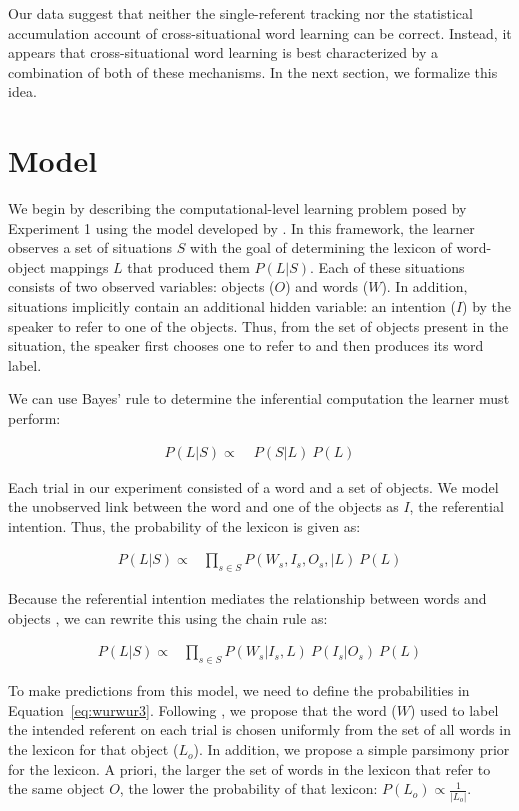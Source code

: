 \documentclass{pnastwo}
\begin{document}
\begin{article}
Our data suggest that neither the single-referent tracking nor the statistical accumulation account of cross-situational word learning can be correct. Instead, it appears that cross-situational word learning is best characterized by a combination of both of these mechanisms. In the next section, we formalize this idea.

\section{Model}

We begin by describing the computational-level learning problem posed by Experiment 1 using the model developed by . In this framework, the learner observes a set of situations $S$ with the goal of determining the lexicon of word-object mappings $L$ that produced them $P(L|S)$. Each of these situations consists of two observed variables: objects ($O$) and words ($W$). In addition, situations implicitly contain an additional hidden variable: an intention ($I$) by the speaker to refer to one of the objects. Thus, from the set of objects present in the situation, the speaker first chooses one to refer to and then produces its word label. 

We can use Bayes' rule to determine the inferential computation the learner must perform: 

\begin{align} 
P(L|S) \propto & \;P(S|L) \: P(L) \label{eq:wurwur1}
\end{align}

\noindent Each trial in our experiment consisted of a word and a set of objects. We model the unobserved link between the word and one of the objects as $I$, the referential intention. Thus, the probability of the lexicon is given as:

\begin{align}
P(L|S) \propto & \prod\limits_{s\in{S}}P(W_{s},I_{s}, O_{s},|L) \: P(L) \label{eq:wurwur2}
\end{align}

\noindent Because the referential intention mediates the relationship between words and objects \cite{Frank2009a}, we can rewrite this using the chain rule as:

\begin{align}
P(L|S) \propto & \prod\limits_{s\in{S}}P(W_{s}| I_{s}, L) \: P(I_{s}|O_{s})  \: P(L) \label{eq:wurwur3}
\end{align}

To make predictions from this model, we need to define the probabilities in Equation~\ref{eq:wurwur3}. Following , we propose that the word  ($W$) used to label the intended referent on each trial is chosen uniformly from the set of all words in the lexicon for that object ($L_{o}$). In addition, we propose a simple parsimony prior for the lexicon. A priori, the larger the set of words in the lexicon that refer to the same object $O$, the lower the probability of that lexicon: $P(L_{o}) \propto \frac{1}{|L_{o}|}$. 


\end{article}
\end{document}
